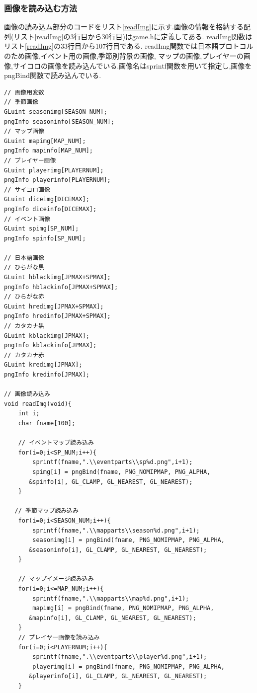 \documentclass[a4j]{jarticle}
\begin{document}
      \subsubsection{画像を読み込む方法}
      画像の読み込ム部分のコードをリスト\ref{readImg}に示す.画像の情報を格納する配列(リスト\ref{readImg}の3行目から30行目)はgame.hに定義してある.
      readImg関数はリスト\ref{readImg}の33行目から107行目である. readImg関数では日本語プロトコルのため画像,イベント用の画像,季節別背景の画像,
      マップの画像,プレイヤーの画像,サイコロの画像を読み込んでいる.画像名はsprintf関数を用いて指定し,画像をpngBind関数で読み込んでいる.
      \begin{lstlisting}[basicstyle=\ttfamily\footnotesize, frame=single,label=readImg,caption=readImg関数]
// 画像用変数
// 季節画像
GLuint seasonimg[SEASON_NUM];
pngInfo seasoninfo[SEASON_NUM];
// マップ画像
GLuint mapimg[MAP_NUM];
pngInfo mapinfo[MAP_NUM];
// プレイヤー画像
GLuint playerimg[PLAYERNUM];
pngInfo playerinfo[PLAYERNUM];
// サイコロ画像
GLuint diceimg[DICEMAX];
pngInfo diceinfo[DICEMAX];
// イベント画像
GLuint spimg[SP_NUM];
pngInfo spinfo[SP_NUM];

// 日本語画像
// ひらがな黒
GLuint hblackimg[JPMAX+SPMAX];
pngInfo hblackinfo[JPMAX+SPMAX];
// ひらがな赤
GLuint hredimg[JPMAX+SPMAX];
pngInfo hredinfo[JPMAX+SPMAX];
// カタカナ黒
GLuint kblackimg[JPMAX];
pngInfo kblackinfo[JPMAX];
// カタカナ赤
GLuint kredimg[JPMAX];
pngInfo kredinfo[JPMAX];

// 画像読み込み
void readImg(void){
    int i;
    char fname[100];

    // イベントマップ読み込み
    for(i=0;i<SP_NUM;i++){
        sprintf(fname,".\\eventparts\\sp%d.png",i+1);
        spimg[i] = pngBind(fname, PNG_NOMIPMAP, PNG_ALPHA, 
       &spinfo[i], GL_CLAMP, GL_NEAREST, GL_NEAREST);        
    }

   // 季節マップ読み込み 
    for(i=0;i<SEASON_NUM;i++){
        sprintf(fname,".\\mapparts\\season%d.png",i+1);
        seasonimg[i] = pngBind(fname, PNG_NOMIPMAP, PNG_ALPHA, 
       &seasoninfo[i], GL_CLAMP, GL_NEAREST, GL_NEAREST);        
    }

    // マップイメージ読み込み
    for(i=0;i<=MAP_NUM;i++){
        sprintf(fname,".\\mapparts\\map%d.png",i+1);
        mapimg[i] = pngBind(fname, PNG_NOMIPMAP, PNG_ALPHA, 
       &mapinfo[i], GL_CLAMP, GL_NEAREST, GL_NEAREST);
    }
    // プレイヤー画像を読み込み
    for(i=0;i<PLAYERNUM;i++){
        sprintf(fname,".\\eventparts\\player%d.png",i+1);
        playerimg[i] = pngBind(fname, PNG_NOMIPMAP, PNG_ALPHA, 
       &playerinfo[i], GL_CLAMP, GL_NEAREST, GL_NEAREST);
    }


\end{lstlisting}
\end{document}
